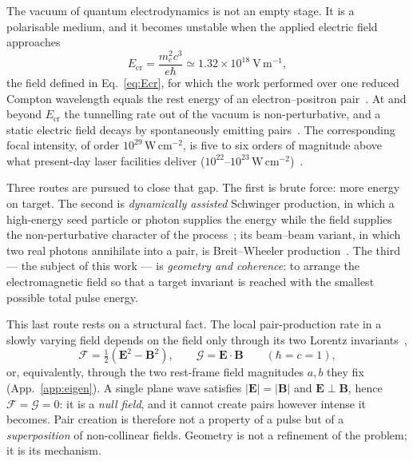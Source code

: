 \documentclass[aps,prd,reprint,superscriptaddress,nofootinbib,floatfix]{revtex4-2}
\begin{document}
The vacuum of quantum electrodynamics is not an empty stage. It is a
polarisable medium, and it becomes unstable when the applied electric field
approaches
\begin{equation}
E_{\mathrm{cr}}=\frac{m_e^2c^3}{e\hbar}\simeq1.32\times10^{18}\ \mathrm{V\,m^{-1}},
\label{eq:Ecr}
\end{equation}
the field defined in Eq.~\eqref{eq:Ecr}, for which the work performed over
one reduced Compton wavelength equals the rest energy of an
electron--positron pair~\cite{Sauter1931,Schwinger1951}.
At and beyond $E_{\mathrm{cr}}$ the tunnelling rate out of the vacuum is
non-perturbative, and a static electric field decays by spontaneously emitting
pairs~\cite{HeisenbergEuler1936}. The corresponding focal intensity,
of order $10^{29}\,\mathrm{W\,cm^{-2}}$, is five to six orders of magnitude
above what present-day laser facilities deliver
($10^{22}$--$10^{23}\,\mathrm{W\,cm^{-2}}$)~\cite{DiPiazza2012}.

Three routes are pursued to close that gap. The first is brute force: more
energy on target. The second is \emph{dynamically assisted} Schwinger
production, in which a high-energy seed particle or photon supplies the energy
while the field supplies the non-perturbative character of the
process~\cite{Fedotov2023}; its beam--beam variant, in which two real photons
annihilate into a pair, is Breit--Wheeler production~\cite{BreitWheeler1934}.
The third --- the subject of this work --- is \emph{geometry and coherence}: to
arrange the electromagnetic field so that a target invariant is reached with
the smallest possible total pulse energy.

This last route rests on a structural fact. The local pair-production rate in
a slowly varying field depends on the field only through its two Lorentz
invariants~\cite{Schwinger1951},
\begin{equation}
\mathcal{F}=\tfrac12\!\left(\mathbf{E}^2-\mathbf{B}^2\right),
\qquad
\mathcal{G}=\mathbf{E}\cdot\mathbf{B}
\qquad (\hbar=c=1),
\label{eq:invariants}
\end{equation}
or, equivalently, through the two rest-frame field magnitudes $a,b$ they fix
(App.~\ref{app:eigen}). A single plane wave satisfies
$|\mathbf{E}|=|\mathbf{B}|$ and $\mathbf{E}\perp\mathbf{B}$, hence
$\mathcal{F}=\mathcal{G}=0$: it is a \emph{null field}, and it cannot create
pairs however intense it becomes. Pair creation is therefore not a property of
a pulse but of a \emph{superposition} of non-collinear fields. Geometry is not
a refinement of the problem; it is its mechanism.
\end{document}
